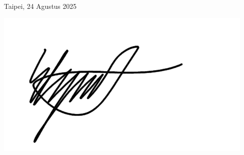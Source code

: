 \vspace*{1cm}
\begin{flushright}
    Taipei, 24 Agustus 2025

    \vspace{0.5cm}
    
    \includegraphics[width=0.25\linewidth]{assets/TandaTangan.png}\\[0.5cm]

    \penulis

\end{flushright}